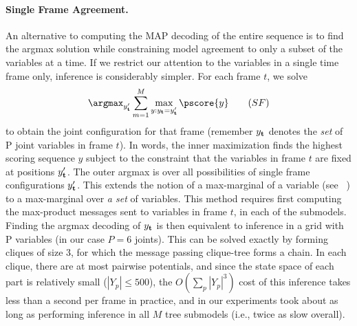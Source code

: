 

\paragraph{Single Frame Agreement.} An alternative to computing the
MAP decoding of the entire sequence is to find the argmax solution
while constraining model agreement to only a subset of the variables
at a time.  If we restrict our attention to the variables in a single
time frame only, inference is considerably simpler.  For each frame
$t$, we solve
\begin{equation}
\argmax_{y_{\bf{t}}'} \sum_{m=1}^M \max_{y : y_{\bf{t}} = y_{\bf{t}}'} \pscore{y} \quad{}\quad{(SF)}
\end{equation}
to obtain the joint configuration for that frame (remember $y_{\bf t}$
denotes the {\em set} of P joint variables in frame $t$).  In words,
the inner maximization finds the highest scoring sequence $y$ subject to
the constraint that the variables in frame $t$ are fixed at positions
$y_{\bf t}'$.  The outer argmax is over all possibilities of single
frame configurations $y_{\bf t}'$.  This extends the notion of a
max-marginal of a variable (see ~\cite{weiss10}) to a max-marginal
over {\em a set} of variables.  This method requires first computing
the max-product messages sent to variables in frame $t$, in each of
the submodels.  Finding the argmax decoding of $y_{\bf t}$ is then
equivalent to inference in a grid with P variables (in our case $P=6$
joints).  This can be solved exactly by forming cliques of size 3, for
which the message passing clique-tree forms a chain.  In each clique,
there are at most pairwise potentials, and since the state space of
each part is relatively small ($|Y_p| \leq 500$), the $O(\sum_p
|Y_p|^3)$ cost of this inference takes less than a second per frame in
practice, and in our experiments took about as long as performing inference in all $M$ tree submodels (i.e., twice as slow overall).


